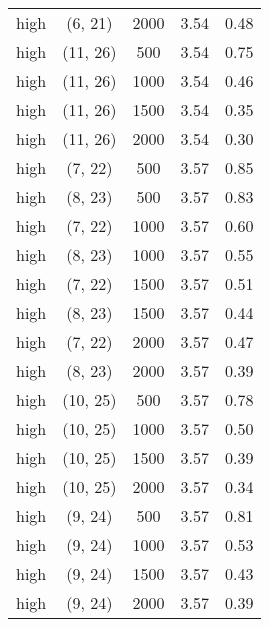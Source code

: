 \begin{tabular}{c c c c c}
high & (6, 21) &  2000 & 3.54 & 0.48 \\
high & (11, 26) &  500 & 3.54 & 0.75 \\
high & (11, 26) &  1000 & 3.54 & 0.46 \\
high & (11, 26) &  1500 & 3.54 & 0.35 \\
high & (11, 26) &  2000 & 3.54 & 0.30 \\
high & (7, 22) &  500 & 3.57 & 0.85 \\
high & (8, 23) &  500 & 3.57 & 0.83 \\
high & (7, 22) &  1000 & 3.57 & 0.60 \\
high & (8, 23) &  1000 & 3.57 & 0.55 \\
high & (7, 22) &  1500 & 3.57 & 0.51 \\
high & (8, 23) &  1500 & 3.57 & 0.44 \\
high & (7, 22) &  2000 & 3.57 & 0.47 \\
high & (8, 23) &  2000 & 3.57 & 0.39 \\
high & (10, 25) &  500 & 3.57 & 0.78 \\
high & (10, 25) &  1000 & 3.57 & 0.50 \\
high & (10, 25) &  1500 & 3.57 & 0.39 \\
high & (10, 25) &  2000 & 3.57 & 0.34 \\
high & (9, 24) &  500 & 3.57 & 0.81 \\
high & (9, 24) &  1000 & 3.57 & 0.53 \\
high & (9, 24) &  1500 & 3.57 & 0.43 \\
high & (9, 24) &  2000 & 3.57 & 0.39 \\
\hline
\end{tabular}
